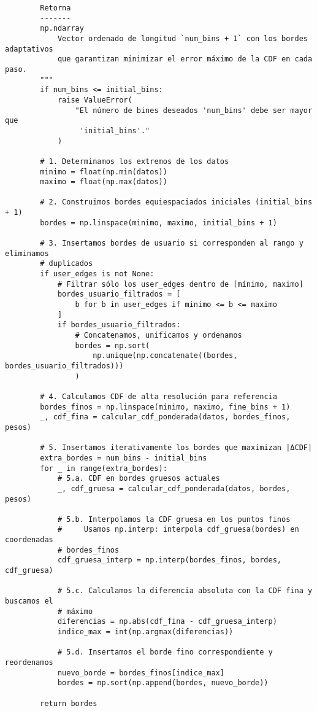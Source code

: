 \begin{verbatim}
        Retorna
        -------
        np.ndarray
            Vector ordenado de longitud `num_bins + 1` con los bordes adaptativos
            que garantizan minimizar el error máximo de la CDF en cada paso.
        """
        if num_bins <= initial_bins:
            raise ValueError(
                "El número de bines deseados 'num_bins' debe ser mayor que
                 'initial_bins'."
            )
    
        # 1. Determinamos los extremos de los datos
        minimo = float(np.min(datos))
        maximo = float(np.max(datos))
    
        # 2. Construimos bordes equiespaciados iniciales (initial_bins + 1)
        bordes = np.linspace(minimo, maximo, initial_bins + 1)
    
        # 3. Insertamos bordes de usuario si corresponden al rango y eliminamos 
        # duplicados
        if user_edges is not None:
            # Filtrar sólo los user_edges dentro de [mínimo, maximo]
            bordes_usuario_filtrados = [
                b for b in user_edges if minimo <= b <= maximo
            ]
            if bordes_usuario_filtrados:
                # Concatenamos, unificamos y ordenamos
                bordes = np.sort(
                    np.unique(np.concatenate((bordes, bordes_usuario_filtrados)))
                )
    
        # 4. Calculamos CDF de alta resolución para referencia
        bordes_finos = np.linspace(minimo, maximo, fine_bins + 1)
        _, cdf_fina = calcular_cdf_ponderada(datos, bordes_finos, pesos)
    
        # 5. Insertamos iterativamente los bordes que maximizan |ΔCDF|
        extra_bordes = num_bins - initial_bins
        for _ in range(extra_bordes):
            # 5.a. CDF en bordes gruesos actuales
            _, cdf_gruesa = calcular_cdf_ponderada(datos, bordes, pesos)
    
            # 5.b. Interpolamos la CDF gruesa en los puntos finos
            #     Usamos np.interp: interpola cdf_gruesa(bordes) en coordenadas 
            # bordes_finos
            cdf_gruesa_interp = np.interp(bordes_finos, bordes, cdf_gruesa)
    
            # 5.c. Calculamos la diferencia absoluta con la CDF fina y buscamos el 
            # máximo
            diferencias = np.abs(cdf_fina - cdf_gruesa_interp)
            indice_max = int(np.argmax(diferencias))
    
            # 5.d. Insertamos el borde fino correspondiente y reordenamos
            nuevo_borde = bordes_finos[indice_max]
            bordes = np.sort(np.append(bordes, nuevo_borde))
    
        return bordes
\end{verbatim}

